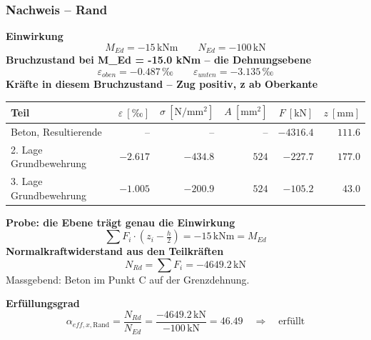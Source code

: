 \documentclass[11pt,a4paper]{article}
\begin{document}
\subsubsection{Nachweis – Rand}
\noindent\textbf{Einwirkung}
\begin{equation*}
M_{Ed} = -15\,\mathrm{kNm} \qquad N_{Ed} = -100\,\mathrm{kN}
\end{equation*}
\noindent\textbf{Bruchzustand bei M\_Ed = -15.0 kNm – die Dehnungsebene}
\begin{equation*}
\varepsilon_{oben} = -0.487\,\text{‰} \qquad \varepsilon_{unten} = -3.135\,\text{‰}
\end{equation*}
\noindent\textbf{Kräfte in diesem Bruchzustand – Zug positiv, z ab Oberkante}
\begin{longtable}{lrrrrr}
\hline
Teil & $\varepsilon\ [‰]$ & $\sigma\ [\mathrm{N/mm^2}]$ & $A\ [\mathrm{mm}^2]$ & $F\ [\mathrm{kN}]$ & $z\ [\mathrm{mm}]$ \\
\hline
\endhead
Beton, Resultierende & $–$ & $–$ & $–$ & $-4316.4$ & $111.6$ \\
2. Lage Grundbewehrung & $-2.617$ & $-434.8$ & $524$ & $-227.7$ & $177.0$ \\
3. Lage Grundbewehrung & $-1.005$ & $-200.9$ & $524$ & $-105.2$ & $43.0$ \\
\hline
\end{longtable}
\noindent\textbf{Probe: die Ebene trägt genau die Einwirkung}
\begin{equation*}
\sum F_i \cdot \left(z_i - \tfrac{h}{2}\right) = -15\,\mathrm{kNm} = M_{Ed}
\end{equation*}
\noindent\textbf{Normalkraftwiderstand aus den Teilkräften}
\begin{equation*}
N_{Rd} = \sum F_i = -4649.2\,\mathrm{kN}
\end{equation*}
Massgebend: Beton im Punkt C auf der Grenzdehnung.

\noindent\textbf{Erfüllungsgrad}
\begin{equation*}
\alpha_{eff,x,\text{Rand}} = \frac{N_{Rd}}{N_{Ed}} = \frac{-4649.2\,\mathrm{kN}}{-100\,\mathrm{kN}} = 46.49 \quad \Rightarrow \quad \text{erfüllt}
\end{equation*}
\end{document}
